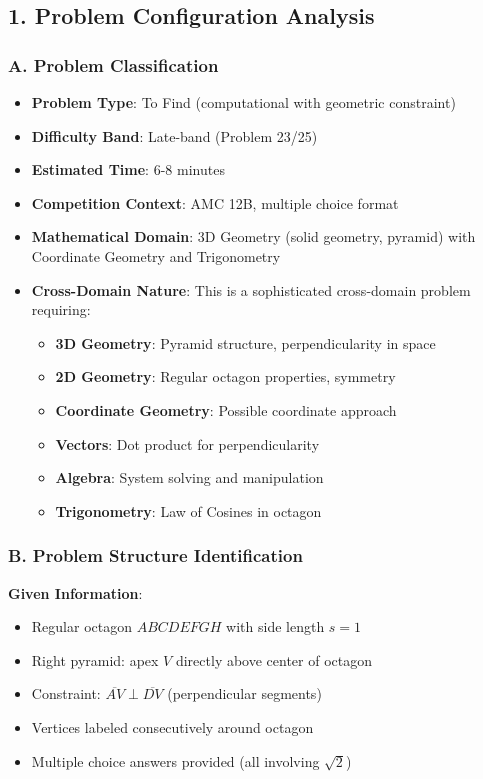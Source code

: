 \documentclass[12pt]{article}
\begin{document}
\begin{problemconfigbox}
\subsection*{1. Problem Configuration Analysis}

\subsubsection*{A. Problem Classification}

\begin{itemize}[leftmargin=*]
    \item \textbf{Problem Type}: To Find (computational with geometric constraint)
    \item \textbf{Difficulty Band}: Late-band (Problem 23/25)
    \item \textbf{Estimated Time}: 6-8 minutes
    \item \textbf{Competition Context}: AMC 12B, multiple choice format
    \item \textbf{Mathematical Domain}: 3D Geometry (solid geometry, pyramid) with Coordinate Geometry and Trigonometry
    \item \textbf{Cross-Domain Nature}: This is a sophisticated cross-domain problem requiring:
    \begin{itemize}
        \item \textbf{3D Geometry}: Pyramid structure, perpendicularity in space
        \item \textbf{2D Geometry}: Regular octagon properties, symmetry
        \item \textbf{Coordinate Geometry}: Possible coordinate approach
        \item \textbf{Vectors}: Dot product for perpendicularity
        \item \textbf{Algebra}: System solving and manipulation
        \item \textbf{Trigonometry}: Law of Cosines in octagon
    \end{itemize}
\end{itemize}

\subsubsection*{B. Problem Structure Identification}

\textbf{Given Information}:
\begin{itemize}
    \item Regular octagon $ABCDEFGH$ with side length $s = 1$
    \item Right pyramid: apex $V$ directly above center of octagon
    \item Constraint: $\overline{AV} \perp \overline{DV}$ (perpendicular segments)
    \item Vertices labeled consecutively around octagon
    \item Multiple choice answers provided (all involving $\sqrt{2}$)
\end{itemize}


\end{problemconfigbox}
\end{document}

